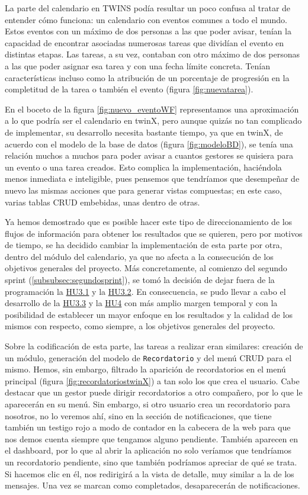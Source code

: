 La parte del calendario en TWINS podía resultar un poco confusa al tratar de entender cómo funciona: un calendario con eventos comunes a todo el mundo. Estos eventos con un máximo de dos personas a las que poder avisar, tenían la capacidad de encontrar asociadas numerosas tareas que dividían el evento en distintas etapas. Las tareas, a su vez, contaban con otro máximo de dos personas a las que poder asignar esa tarea y con una fecha límite concreta. Tenían características incluso como la atribución de un porcentaje de progresión en la completitud de la tarea o también el evento (figura \ref{fig:nuevatarea}).

En el boceto de la figura \ref{fig:nuevo_eventoWF} representamos una aproximación a lo que podría ser el calendario en twinX, pero aunque quizás no tan complicado de implementar, su desarrollo necesita bastante tiempo, ya que en twinX, de acuerdo con el modelo de la base de datos (figura \ref{fig:modeloBD}), se tenía una relación muchos a muchos para poder avisar a cuantos gestores se quisiera para un evento o una tarea creados. Esto complica la implementación, haciéndola menos inmediata e inteligible, pues pensemos que tendríamos que desempeñar de nuevo las mismas acciones que para generar vistas compuestas; en este caso, varias tablas CRUD embebidas, unas dentro de otras.

Ya hemos demostrado que es posible hacer este tipo de direccionamiento de los flujos de información para obtener los resultados que se quieren, pero por motivos de tiempo, se ha decidido cambiar la implementación de esta parte por otra, dentro del módulo del calendario, ya que no afecta a la consecución de los objetivos generales del proyecto. Más concretamente, al comienzo del segundo sprint (\ref{subsubsec:segundosprint}), se tomó la decisión de dejar fuera de la programación la \hyperref[tab:HU3.1]{HU3.1} y la \hyperref[tab:HU3.2]{HU3.2}. En consecuencia, se pudo llevar a cabo el desarrollo de la \hyperref[tab:HU3.3]{HU3.3} y la \hyperref[tab:HU4]{HU4} con más amplio margen temporal y con la posibilidad de establecer un mayor enfoque en los resultados y la calidad de los mismos con respecto, como siempre, a los objetivos generales del proyecto.

Sobre la codificación de esta parte, las tareas a realizar eran similares: creación de un módulo, generación del modelo de \texttt{Recordatorio} y del menú CRUD para el mismo. Hemos, sin embargo, filtrado la aparición de recordatorios en el menú principal (figura \ref{fig:recordatoriostwinX}) a tan solo los que crea el usuario. Cabe destacar que un gestor puede dirigir recordatorios a otro compañero, por lo que le aparecerán en su menú. Sin embargo, si otro usuario crea un recordatorio para nosotros, no lo veremos ahí, sino en la sección de notificaciones, que tiene también un testigo rojo a modo de contador en la cabecera de la web para que nos demos cuenta siempre que tengamos alguno pendiente. También aparecen en el dashboard, por lo que al abrir la aplicación no solo veríamos que tendríamos un recordatorio pendiente, sino que también podríamos apreciar de qué se trata. Si hacemos clic en él, nos redirigirá a la vista de detalle, muy similar a la de los mensajes. Una vez se marcan como completados, desaparecerán de notificaciones.

